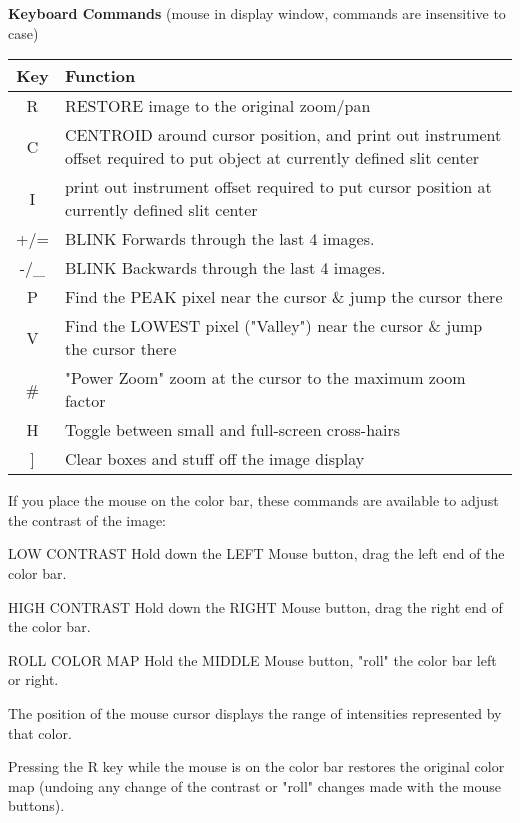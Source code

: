 \documentclass[10pt]{article}
\renewcommand{\[}{\begin{eqnarray}}
\renewcommand{\]}{\end{eqnarray}}
\newenvironment{example}{
        \begin{list}{}{
                \labelsep=0.25in
                \labelwidth=2.0in
                \leftmargin=2.75in
                \itemindent=0in
                \itemsep=0in
                \parsep=0in
        }
}{
        \end{list}
}
\begin{document}
\begin{center}
{\bf Keyboard Commands} (mouse in display window, commands are insensitive
to case)\\
\begin{tabular}{cl}
\hline
Key & Function\\
\hline
 R &RESTORE image to the original zoom/pan\\
 C &CENTROID around cursor position, and print out instrument offset required
    to put object at currently defined slit center\\
 I &print out instrument offset required to put cursor position at currently
    defined slit center\\
 +/= &BLINK Forwards through the last 4 images.\\
 -/\_ &BLINK Backwards through the last 4 images.\\
 P &Find the PEAK pixel near the cursor \& jump the cursor there\\
 V &Find the LOWEST pixel ("Valley") near the cursor \& jump the cursor there\\
 \# &"Power Zoom" zoom at the cursor to the maximum zoom factor\\
 H &Toggle between small and full-screen cross-hairs\\
 ] &Clear boxes and stuff off the image display\\
\hline
\end{tabular}
\end{center}

If you place the mouse on the color bar, these commands are available
to adjust the contrast of the image:
\begin{example}
  \item[LOW CONTRAST]{Hold down the LEFT Mouse button, drag the left
       end of the color bar.}

  \item[HIGH CONTRAST]{Hold down the RIGHT Mouse button, drag the right
       end of the color bar.}

  \item[ROLL COLOR MAP]{Hold the MIDDLE Mouse button, "roll" the
       color bar left or right.}
\end{example}
The position of the mouse cursor displays the range of intensities
represented by that color.

Pressing the R key while the mouse is on the color bar restores the
original color map (undoing any change of the contrast or "roll" changes
made with the mouse buttons).
\end{document}
